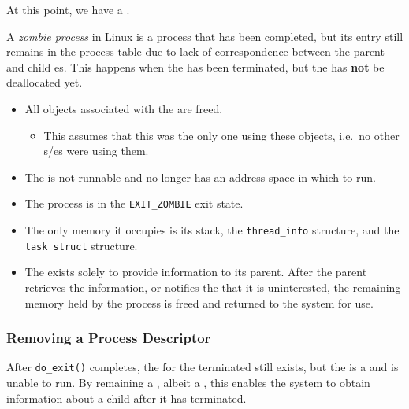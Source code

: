 At this point, we have a .

\begin{definition}\label{def:Zombie_Process}
  A \emph{zombie process} in Linux is a process that has been completed, but its entry still remains in the process table due to lack of correspondence between the parent and child es.
  This happens when the  has been terminated, but the  has \textbf{not} be deallocated yet.

  \begin{itemize}[noitemsep]
  \item All objects associated with the  are freed.
    \begin{itemize}[noitemsep]
    \item This assumes that this  was the only one using these objects, i.e.\ no other s/es were using them.
    \end{itemize}
  \item The  is not runnable and no longer has an address space in which to run.
  \item The process is in the \texttt{EXIT_ZOMBIE} exit state.
  \item The only memory it occupies is its  stack, the \texttt{thread_info} structure, and the \texttt{task_struct} structure.
  \item The  exists solely to provide information to its parent.
    After the parent retrieves the information, or notifies the  that it is uninterested, the remaining memory held by the process is freed and returned to the system for use.
  \end{itemize}
\end{definition}

\subsubsection{Removing a Process Descriptor}\label{subsubsec:Remove_Process_Descriptor}
After \texttt{do_exit()} completes, the  for the terminated  still exists, but the  is a  and is unable to run.
By remaining a , albeit a , this enables the system to obtain information about a child  after it has terminated.


